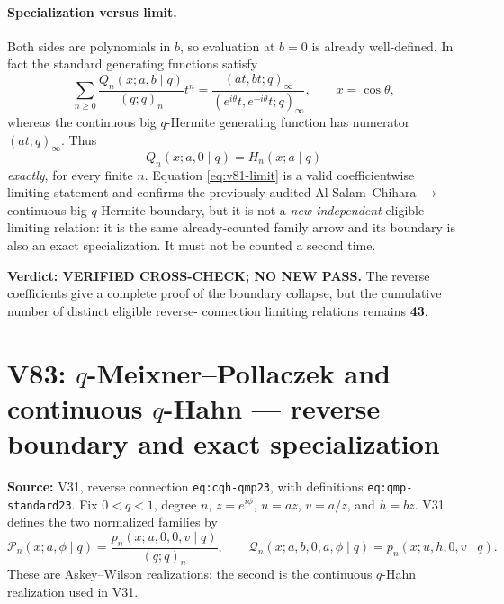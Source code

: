 \documentclass[11pt]{article}
\begin{document}
\paragraph{Specialization versus limit.}
Both sides are polynomials in $b$, so evaluation at $b=0$ is already
well-defined.  In fact the standard generating functions satisfy
\[
 \sum_{n\ge0}\frac{Q_n(x;a,b\mid q)}{(q;q)_n}t^n
 =\frac{(at,bt;q)_\infty}{(e^{i\theta}t,e^{-i\theta}t;q)_\infty},
 \qquad x=\cos\theta,
\]
whereas the continuous big $q$-Hermite generating function has numerator
$(at;q)_\infty$. Thus
\begin{equation}\label{eq:v81-exact}
 Q_n(x;a,0\mid q)=H_n(x;a\mid q)
\end{equation}
\emph{exactly}, for every finite $n$.  Equation \eqref{eq:v81-limit}
is a valid coefficientwise limiting statement and confirms the
previously audited Al-Salam--Chihara $\to$ continuous big
$q$-Hermite boundary, but it is not a \emph{new independent} eligible
limiting relation: it is the same already-counted family arrow and
its boundary is also an exact specialization.  It must not be
counted a second time.

\noindent\textbf{Verdict: VERIFIED CROSS-CHECK; NO NEW PASS.}
The reverse coefficients give a complete proof of the boundary
collapse, but the cumulative number of distinct eligible reverse-
connection limiting relations remains \textbf{43}.



\section{V83: $q$-Meixner--Pollaczek and continuous $q$-Hahn --- reverse boundary and exact specialization}
\noindent\textbf{Source:} V31, reverse connection
\texttt{eq:cqh-qmp23}, with definitions \texttt{eq:qmp-standard23}.
Fix $0<q<1$, degree $n$, $z=e^{i\phi}$, $u=az$, $v=a/z$,
and $h=bz$.  V31 defines the two normalized families by
\[
 \mathscr P_n(x;a,\phi\mid q)
 =\frac{p_n(x;u,0,0,v\mid q)}{(q;q)_n},\qquad
 \mathscr Q_n(x;a,b,0,a,\phi\mid q)
 =p_n(x;u,h,0,v\mid q).
\]
These are Askey--Wilson realizations; the second is the
continuous $q$-Hahn realization used in V31.
\end{document}
